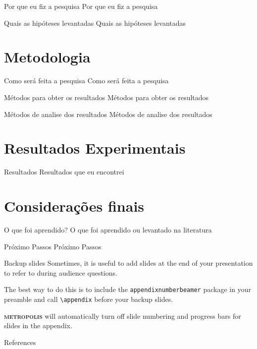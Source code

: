 \documentclass[10pt]{beamer}
\newcommand{\themename}{\textbf{\textsc{metropolis}}\xspace}
\begin{document}
\begin{frame}[fragile]{Por que eu fiz a pesquisa}
Por que eu fiz a pesquisa
\end{frame}

\begin{frame}[fragile]{Quais as hipóteses levantadas}
Quais as hipóteses levantadas
\end{frame}

\section{Metodologia}

\begin{frame}[fragile]{Como será feita a pesquisa}
Como será feita a pesquisa
\end{frame}

\begin{frame}[fragile]{Métodos para obter os resultados}
Métodos para obter os resultados
\end{frame}

\begin{frame}[fragile]{Métodos de analise dos resultados}
Métodos de analise dos resultados
\end{frame}

\section{Resultados Experimentais}

\begin{frame}[fragile]{Resultados}
Resultados que eu encontrei
\end{frame}

\section{Considerações finais}

\begin{frame}[fragile]{O que foi aprendido?}
O que foi aprendido ou levantado na literatura
\end{frame}

\begin{frame}[fragile]{Próximo Passos}
Próximo Passos
\end{frame}

\appendix

\begin{frame}[fragile]{Backup slides}
  Sometimes, it is useful to add slides at the end of your presentation to
  refer to during audience questions.

  The best way to do this is to include the \verb|appendixnumberbeamer|
  package in your preamble and call \verb|\appendix| before your backup slides.

  \themename will automatically turn off slide numbering and progress bars for
  slides in the appendix.
\end{frame}

\begin{frame}[allowframebreaks]{References}

  
  
\end{frame}
\end{document}
